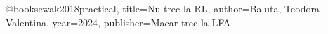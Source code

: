 @book{sewak2018practical,
title={Nu trec la RL},
author={Baluta, Teodora-Valentina},
year={2024},
publisher={Macar trec la LFA}
}